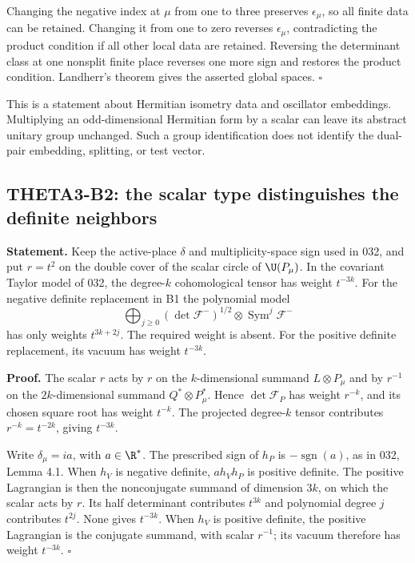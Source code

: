 Changing the negative index at $\mu$ from one to three preserves $\epsilon_\mu$, so all finite data can be retained. Changing it from one to zero reverses $\epsilon_\mu$, contradicting the product condition if all other local data are retained. Reversing the determinant class at one nonsplit finite place reverses one more sign and restores the product condition. Landherr's theorem gives the asserted global spaces. \hfill$\square$

This is a statement about Hermitian isometry data and oscillator embeddings. Multiplying an odd-dimensional Hermitian form by a scalar can leave its abstract unitary group unchanged. Such a group identification does not identify the dual-pair embedding, splitting, or test vector.

\subsection{THETA3-B2: the scalar type distinguishes the definite neighbors}\label{B2}

\textbf{Statement.} Keep the active-place $\delta$ and multiplicity-space sign used in 032, and put $r=t^2$ on the double cover of the scalar circle of $\U(P_\mu)$. In the covariant Taylor model of 032, the degree-$k$ cohomological tensor has weight $t^{-3k}$. For the negative definite replacement in B1 the polynomial model
\[
 \bigoplus_{j\geq0}(\det\mathcal F^-)^{1/2}\otimes
                    \operatorname{Sym}^j\mathcal F^-
\]
has only weights $t^{3k+2j}$. The required weight is absent. For the positive definite replacement, its vacuum has weight $t^{-3k}$.

\textbf{Proof.} The scalar $r$ acts by $r$ on the $k$-dimensional summand $L\otimes P_\mu$ and by $r^{-1}$ on the $2k$-dimensional summand $Q^*\otimes P_\mu^*$. Hence $\det\mathcal F_P$ has weight $r^{-k}$, and its chosen square root has weight $t^{-k}$. The projected degree-$k$ tensor contributes $r^{-k}=t^{-2k}$, giving $t^{-3k}$.

Write $\delta_\mu=ia$, with $a\in\R^*$. The prescribed sign of $h_P$ is $-\operatorname{sgn}(a)$, as in 032, Lemma 4.1. When $h_V$ is negative definite, $a h_Vh_P$ is positive definite. The positive Lagrangian is then the nonconjugate summand of dimension $3k$, on which the scalar acts by $r$. Its half determinant contributes $t^{3k}$ and polynomial degree $j$ contributes $t^{2j}$. None gives $t^{-3k}$. When $h_V$ is positive definite, the positive Lagrangian is the conjugate summand, with scalar $r^{-1}$; its vacuum therefore has weight $t^{-3k}$. \hfill$\square$

